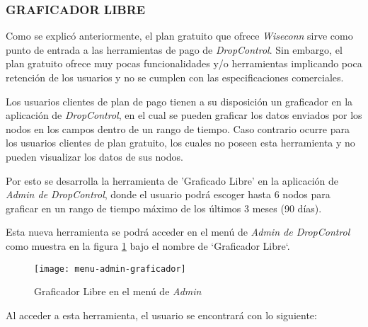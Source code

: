 \subsubsection{GRAFICADOR LIBRE}

Como se explicó anteriormente, el plan gratuito que ofrece \textit{Wiseconn} sirve como punto de entrada a las herramientas
de pago de \textit{DropControl}. Sin embargo, el plan gratuito ofrece muy pocas funcionalidades y/o herramientas
implicando poca retención de los usuarios y no se cumplen con las especificaciones comerciales.

Los usuarios clientes de plan de pago tienen a su disposición un graficador en la aplicación de \textit{DropControl}, en el cual
se pueden graficar los datos enviados por los nodos en los campos dentro de un rango de tiempo.
Caso contrario ocurre para los usuarios clientes de plan gratuito, los cuales no poseen esta herramienta y
no pueden visualizar los datos de sus nodos.

Por esto se desarrolla la herramienta de 'Graficado Libre' en la aplicación de \textit{Admin de DropControl},
donde el usuario podrá escoger hasta 6 nodos para graficar en un rango de tiempo máximo de los últimos 3 meses (90 días).

Esta nueva herramienta se podrá acceder en el menú de \textit{Admin de DropControl} como muestra en la figura \ref{fig:menu-admin-graf1} bajo el nombre de `Graficador Libre`. 

\begin{figure}[H]
	\centering
	\texttt{[image: menu-admin-graficador]}
	\caption{\label{fig:menu-admin-graf1} Graficador Libre en el menú de \textit{Admin}}
\end{figure}

Al acceder a esta herramienta, el usuario se encontrará con lo siguiente:

